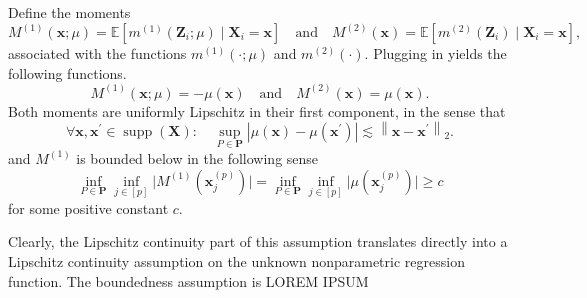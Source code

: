 \documentclass[letterpaper,10pt]{article}
\numberwithin{equation}{section}
\numberwithin{theorem}{section}
\theoremstyle{definition}
\newcommand{\1}{\mathbb{1}}
\begin{document}
\vspace{0.5cm}
\begin{assumption}
	Define the moments
	\begin{equation}
		M^{(1)}(\mathbf{x} ; \mu)
		= \mathbb{E}\left[m^{(1)}\left(\mathbf{Z}_i ; \mu\right) \mid \mathbf{X}_i= \mathbf{x}\right]
		\quad \text{and} \quad
		M^{(2)}(\mathbf{x})
		= \mathbb{E}\left[m^{(2)}\left(\mathbf{Z}_i\right) \mid \mathbf{X}_i = \mathbf{x}\right],
	\end{equation}
	associated with the functions $m^{(1)}(\cdot ; \mu)$ and $m^{(2)}(\cdot)$.
	Plugging in yields the following functions.
	\begin{equation}
		M^{(1)}(\mathbf{x} ; \mu)
		= -\mu(\mathbf{x})
		\quad \text{and} \quad
		M^{(2)}(\mathbf{x})
		= \mu(\mathbf{x}).
	\end{equation}
	Both moments are uniformly Lipschitz in their first component, in the sense that
	\begin{equation}
		\forall \mathbf{x}, \mathbf{x}^{\prime} \in \operatorname{supp}\left(\mathbf{X}\right): \quad
		\sup _{P \in \mathbf{P}}
		\left|\mu(\mathbf{x})-\mu\left(\mathbf{x}^{\prime}\right)\right|
		\lesssim\left\|\mathbf{x}-\mathbf{x}^{\prime}\right\|_{2}.
	\end{equation}
	and $M^{(1)}$ is bounded below in the following sense
	\begin{equation}
		\inf_{P \in \mathbf{P}} \inf_{j \in [p]} \Big|M^{(1)}\left(\mathbf{x}^{(p)}_{j}\right) \Big|
		= \inf_{P \in \mathbf{P}} \inf_{j \in [p]} \Big|\mu\left(\mathbf{x}^{(p)}_{j}\right) \Big| \geq c
	\end{equation}
	for some positive constant $c$.
\end{assumption}

Clearly, the Lipschitz continuity part of this assumption translates directly into a Lipschitz continuity assumption on the unknown nonparametric regression function.
The boundedness assumption is
	{\color{red} LOREM IPSUM}


\end{document}
